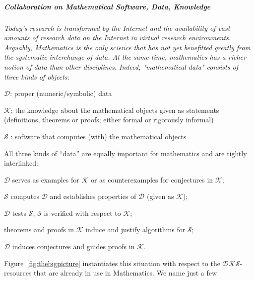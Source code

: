 
\subparagraph{Collaboration on Mathematical Software, Data, Knowledge}\label{}

\begin{center}
\begin{boxedminipage}{.95\textwidth}\em 
Today's research is transformed by the Internet and the availability of vast amounts of
research data on the Internet in virtual research environments. Arguably, Mathematics is
the only science that has not yet benefitted greatly from the systematic interchange of
data. At the same time, mathematics has a richer notion of data than other disciplines.
Indeed, "mathematical data" consists of three kinds of objects:
\begin{compactitem}
\item $\mathcal{D}$: proper (numeric/symbolic) data
\item $\mathcal{K}$: the knowledge about the mathematical objects given as statements
  (definitions, theorems or proofs; either formal or rigorously informal)
\item $\mathcal{S}$ : software that computes (with) the mathematical objects
\end{compactitem}

All three kinds of ``data'' are equally important for mathematics and are tightly
interlinked:
\begin{compactitem}
\item $\mathcal{D}$ serves as examples for $\mathcal{K}$ or as counterexamples for
  conjectures in $\mathcal{K}$;
\item $\mathcal{S}$ computes $\mathcal{D}$ and establishes properties of $\mathcal{D}$
  (given as $\mathcal{K}$);
\item $\mathcal{D}$ tests $\mathcal{S}$, $\mathcal{S}$ is verified with respect to
  $\mathcal{K}$;
\item theorems and proofs in $\mathcal{K}$ induce and justify algorithms for
  $\mathcal{S}$;
\item $\mathcal{D}$ induces conjectures and guides proofs in $\mathcal{K}$.
\end{compactitem}
\end{boxedminipage}
\end{center}
Figure~\ref{fig:thebigpicture} instantiates this situation with respect to the
$\mathcal{DKS}$-resources that are already in use in Mathematics. We name just a few
